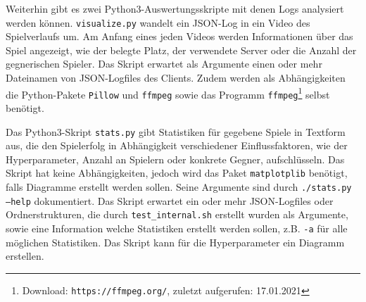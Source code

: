 \documentclass[12pt,a4paper]{article}
\begin{document}
Weiterhin gibt es zwei Python3-Auswertungsskripte mit denen Logs analysiert werden können. \texttt{visualize.py} wandelt ein JSON-Log in ein Video des Spielverlaufs um. Am Anfang eines jeden Videos werden Informationen über das Spiel angezeigt, wie der belegte Platz, der verwendete Server oder die Anzahl der gegnerischen Spieler. Das Skript erwartet als Argumente einen oder mehr Dateinamen von JSON-Logfiles des Clients. Zudem werden als Abhängigkeiten die Python-Pakete \texttt{Pillow} und \texttt{ffmpeg} sowie das Programm \texttt{ffmpeg}\footnote{Download: \texttt{https://ffmpeg.org/}, zuletzt aufgerufen: 17.01.2021} selbst benötigt.

Das Python3-Skript \texttt{stats.py} gibt Statistiken für gegebene Spiele in Textform aus, die den Spielerfolg in Abhängigkeit verschiedener Einflussfaktoren, wie der Hyperparameter, Anzahl an Spielern oder konkrete Gegner, aufschlüsseln. Das Skript hat keine Abhängigkeiten, jedoch wird das Paket \texttt{matplotplib} benötigt, falls Diagramme erstellt werden sollen. Seine Argumente sind durch \texttt{./stats.py --help} dokumentiert. Das Skript erwartet ein oder mehr JSON-Logfiles oder Ordnerstrukturen, die durch \texttt{test\_internal.sh} erstellt wurden als Argumente, sowie eine Information welche Statistiken erstellt werden sollen, z.B. \texttt{-a} für alle möglichen Statistiken. Das Skript kann für die Hyperparameter ein Diagramm erstellen.
\end{document}
